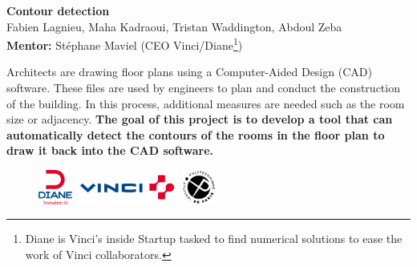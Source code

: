 \documentclass[11pt]{article}
\begin{document}
\begin{center}
\textbf{Contour detection} \\
Fabien Lagnieu, Maha Kadraoui, Tristan Waddington, Abdoul Zeba\\
\textbf{Mentor:} Stéphane Maviel (CEO Vinci/Diane\footnote{Diane is Vinci's inside Startup tasked to find numerical solutions
to ease the work of Vinci collaborators.}) \\\vspace{2em}
\textbf{\Large }
\end{center}
\vspace{-1cm}

Architects are drawing floor plans using a Computer-Aided Design (CAD) software. These files are used
by engineers to plan and conduct the construction of the building. In this process,
additional measures are needed such as the room size or adjacency. \textbf{The goal of 
this project is to develop a tool that can automatically detect the contours of 
the rooms in the floor plan to draw it back into the CAD software.}

\begin{figure}[h]
    \centering
    \includegraphics[width=0.1\textwidth]{figures/Diane.png}
    \hspace{0.1\textwidth}
    \includegraphics[width=0.3\textwidth]{figures/logo_vinci.png}
    \hspace{0.1\textwidth}
    \includegraphics[width=0.1\textwidth]{figures/ipparis.png}

    \label{fig:my_label}
\end{figure}
\end{document}

